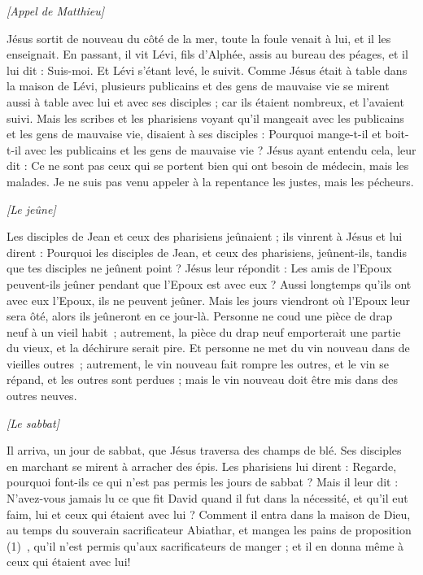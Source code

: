 \begin{multicols}{2}
\begin{center}
\textit{[Appel de Matthieu]}
\end{center}
\PPE{}
Jésus sortit de nouveau du côté de la mer, toute la foule venait à lui, et il les enseignait.
En passant, il vit Lévi, fils d'Alphée, assis au bureau des péages, et il lui dit : Suis-moi. Et Lévi s'étant levé, le suivit.
Comme Jésus était à table dans la maison de Lévi, plusieurs publicains et des gens de mauvaise vie se mirent aussi à table avec lui et avec ses disciples ; car ils étaient nombreux, et l'avaient suivi.
Mais les scribes et les pharisiens voyant qu'il mangeait avec les publicains et les gens de mauvaise vie, disaient à ses disciples : Pourquoi mange-t-il et boit-t-il avec les publicains et les gens de mauvaise vie ?
Jésus ayant entendu cela, leur dit : Ce ne sont pas ceux qui se portent bien qui ont besoin de médecin, mais les malades. Je ne suis pas venu appeler à la repentance les justes, mais les pécheurs.
\begin{center}
\textit{[Le jeûne]}
\end{center}
\PPE{}
Les disciples de Jean et ceux des pharisiens jeûnaient ; ils vinrent à Jésus et lui dirent : Pourquoi les disciples de Jean, et ceux des pharisiens, jeûnent-ils, tandis que tes disciples ne jeûnent point ?
Jésus leur répondit : Les amis de l'Epoux peuvent-ils jeûner pendant que l'Epoux est avec eux ? Aussi longtemps qu’ils ont avec eux l'Epoux, ils ne peuvent jeûner.
Mais les jours viendront où l'Epoux leur sera ôté, alors ils jeûneront en ce jour-là.
Personne ne coud une pièce de drap neuf à un vieil habit ; autrement, la pièce du drap neuf emporterait une partie du vieux, et la déchirure serait pire.
Et personne ne met du vin nouveau dans de vieilles outres ; autrement, le vin nouveau fait rompre les outres, et le vin se répand, et les outres sont perdues ; mais le vin nouveau doit être mis dans des outres neuves.
\begin{center}
\textit{[Le sabbat]}
\end{center}
\PPE{}
Il arriva, un jour de sabbat, que Jésus traversa des champs de blé. Ses disciples en marchant se mirent à arracher des épis.
Les pharisiens lui dirent : Regarde, pourquoi font-ils ce qui n'est pas permis les jours de sabbat ?
Mais il leur dit : N'avez-vous jamais lu ce que fit David quand il fut dans la nécessité, et qu'il eut faim, lui et ceux qui étaient avec lui ?
Comment il entra dans la maison de Dieu, au temps du souverain sacrificateur Abiathar, et mangea les pains de proposition (1) , qu’il n'est permis qu'aux sacrificateurs de manger ; et il en donna même à ceux qui étaient avec lui!

\end{multicols}
